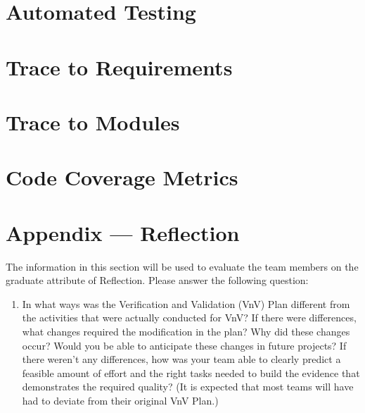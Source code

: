 \documentclass[12pt, titlepage]{article}
\begin{document}
\section{Automated Testing}

\section{Trace to Requirements}

\section{Trace to Modules}

\section{Code Coverage Metrics}




\newpage{}
\section*{Appendix --- Reflection}

The information in this section will be used to evaluate the team members on the
graduate attribute of Reflection.  Please answer the following question:

\begin{enumerate}
  \item In what ways was the Verification and Validation (VnV) Plan different
        from the activities that were actually conducted for VnV?  If there were
        differences, what changes required the modification in the plan?  Why did
        these changes occur?  Would you be able to anticipate these changes in future
        projects?  If there weren't any differences, how was your team able to clearly
        predict a feasible amount of effort and the right tasks needed to build the
        evidence that demonstrates the required quality?  (It is expected that most
        teams will have had to deviate from their original VnV Plan.)
\end{enumerate}
\end{document}

